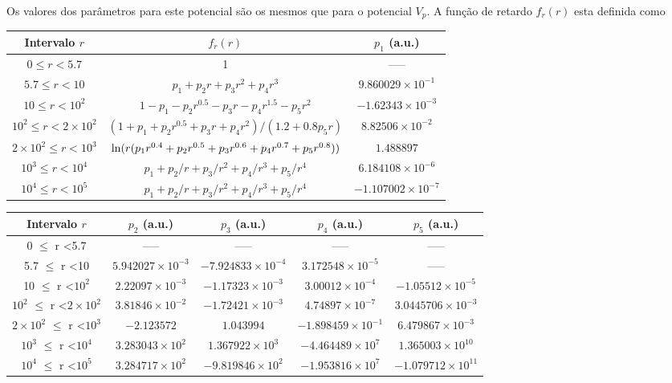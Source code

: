 \documentclass[12pt,twoside,a4paper]{report}
\begin{document}
Os valores dos parâmetros para este potencial são os mesmos que para o 
potencial $V_p$. A função
de retardo $f_r(r)$ esta definida como


\begin{table}[h]
\centering
{\small
\begin{tabular}{|ccc|}
\hline \hline
{\rm Intervalo $r$} & $f_r(r)$ & $p_1$ (a.u.) \\
\hline \hline
$0 \le r <5.7$ & 1 & ----- \\
$5.7 \le r <10$ & $p_1+p_2r+p_3r^2+p_4r^3$ & $9.860029\times10^{-1}$ \\
$10 \le r <10^2$ & $1-p_1-p_2r^{0.5}-p_3r-p_4r^{1.5}-p_5r^2$ & 
$-1.62343\times10^{-3}$ \\
$10^2 \le r <2\times10^2$ & $(1+p_1+p_2r^{0.5}+p_3r+p_4r^2)/(1.2+0.8p_5r)$ &
$8.82506\times10^{-2}$ \\
$2\times10^2 \le r <10^3$ & ${\rm ln}(r(p_1r^{0.4}+p_2r^{0.5}+p_3r^{0.6}
+p_4r^{0.7}+p_5r^{0.8}))$ & $1.488897$ \\
$10^3 \le r <10^4$ & $p_1+p_2/r+p_3/r^2+p_4/r^3+p_5/r^4$ & 
$6.184108\times10^{-6}$ \\
$10^4 \le r <10^5$ & $p_1+p_2/r+p_3/r^2+p_4/r^3+p_5/r^4$ & 
$-1.107002\times10^{-7}$ \\
\hline \hline
\end{tabular}}
\end{table}

\begin{table}[h]
\centering
{\small
\begin{tabular}{|ccccc|}
\hline \hline
{\rm Intervalo $r$} & $p_2$ (a.u.)& $p_3$ (a.u.)& $p_4$ (a.u.)& $p_5$ 
(a.u.)\\
\hline \hline
0 $\le$ r <5.7 & ----- & ----- & ----- & ----- \\
5.7 $\le$ r <10 & $5.942027\times10^{-3}$ & $-7.924833\times10^{-4}$ & 
$3.172548\times10^{-5}$ &
----- \\
10 $\le$ r <$10^2$ & $2.22097\times10^{-3}$ & $-1.17323\times10^{-3}$ & 
$3.00012\times10^{-4}$ &
$-1.05512\times10^{-5}$ \\
$10^2$ $\le$ r <$2\times10^2$ & $3.81846\times10^{-2}$ & 
$-1.72421\times10^{-3}$ &
$4.74897\times10^{-7}$ & $3.0445706\times10^{-3}$ \\
$2\times10^2$ $\le$ r <$10^3$ & $-2.123572$ & $1.043994$ & 
$-1.898459\times10^{-1}$ &
$6.479867\times10^{-3}$ \\
$10^3$ $\le$ r <$10^4$ & $3.283043\times10^2$ & $1.367922\times10^3$ & 
$-4.464489\times10^7$ &
$1.365003\times10^{10}$ \\
$10^4$ $\le$ r <$10^5$ & $3.284717\times10^2$ & $-9.819846\times10^2$ & 
$-1.953816\times10^7$ &
$-1.079712\times10^{11}$ \\
\hline \hline
\end{tabular}}
\end{table}
\end{document}
